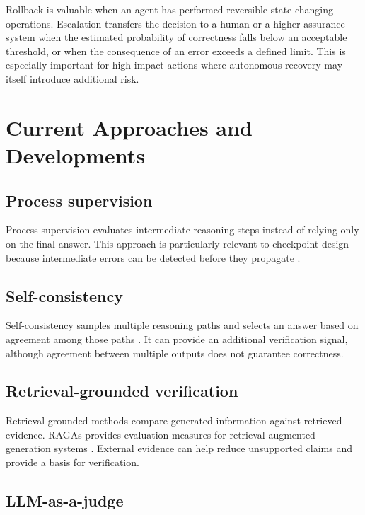 \documentclass[12pt]{article}
\begin{document}
Rollback is valuable when an agent has performed reversible state-changing
operations. Escalation transfers the decision to a human or a
higher-assurance system when the estimated probability of correctness falls
below an acceptable threshold, or when the consequence of an error exceeds a
defined limit. This is especially important for high-impact actions where
autonomous recovery may itself introduce additional risk.

\section{Current Approaches and Developments}
\label{sec:current-approaches}

\subsection{Process supervision}
\label{sec:process-supervision-approach}

Process supervision evaluates intermediate reasoning steps instead of relying
only on the final answer. This approach is particularly relevant to checkpoint
design because intermediate errors can be detected before they propagate
\cite{lightman2023verify}.

\subsection{Self-consistency}
\label{sec:self-consistency}

Self-consistency samples multiple reasoning paths and selects an answer based
on agreement among those paths \cite{wang2023selfconsistency}. It can provide
an additional verification signal, although agreement between multiple outputs
does not guarantee correctness.

\subsection{Retrieval-grounded verification}
\label{sec:retrieval-verification}

Retrieval-grounded methods compare generated information against retrieved
evidence. RAGAs provides evaluation measures for retrieval augmented generation
systems \cite{es2024ragas}. External evidence can help reduce unsupported
claims and provide a basis for verification.

\subsection{LLM-as-a-judge}
\label{sec:llm-judge}
\end{document}
